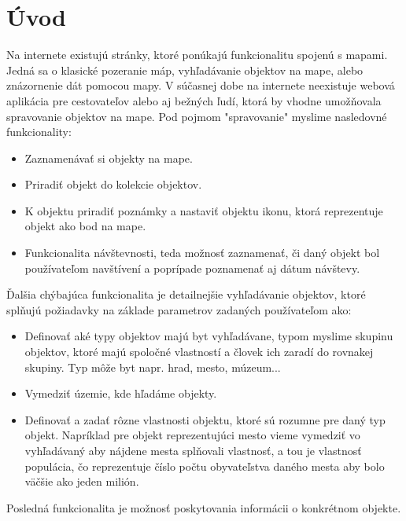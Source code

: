 \chapter*{Úvod}

Na internete existujú stránky, ktoré ponúkajú funkcionalitu spojenú s mapami.
Jedná sa o klasické pozeranie máp, vyhľadávanie objektov na mape, alebo znázornenie  
dát pomocou mapy. V súčasnej dobe na internete neexistuje webová aplikácia pre cestovateľov alebo aj bežných ľudí, ktorá 
by vhodne umožňovala spravovanie objektov na mape.
Pod pojmom "spravovanie" myslime nasledovné funkcionality:
\begin{itemize}
    \item Zaznamenávať si objekty na mape.
    \item Priradiť objekt do kolekcie objektov.
    \item K objektu priradiť poznámky a nastaviť objektu ikonu, ktorá reprezentuje objekt ako  
    bod na mape.
    \item Funkcionalita návštevnosti, teda možnosť zaznamenať, či daný objekt bol 
    používateľom navštívení a poprípade poznamenať aj dátum návštevy.
\end{itemize}

Ďalšia chýbajúca funkcionalita je detailnejšie vyhľadávanie objektov, ktoré splňujú požiadavky na základe parametrov 
zadaných používateľom ako: 
\begin{itemize}
    \item Definovať aké typy objektov majú byt vyhľadávane, typom myslime skupinu objektov, ktoré majú spoločné vlastností
    a človek ich zaradí do rovnakej skupiny. Typ môže byt napr. hrad, mesto, múzeum... 
    \item Vymedziť územie, kde hľadáme objekty.  
    \item  Definovať a zadať rôzne vlastnosti objektu, ktoré sú rozumne pre daný typ objekt.
    Napríklad pre objekt reprezentujúci mesto vieme vymedziť vo vyhľadávaný aby nájdene mesta 
    splňovali vlastnosť, a tou je vlastnosť populácia, čo reprezentuje číslo počtu obyvateľstva
    daného mesta aby bolo väčšie ako jeden milión.  
\end{itemize}

Posledná funkcionalita je možnosť poskytovania informácii o konkrétnom objekte. 

